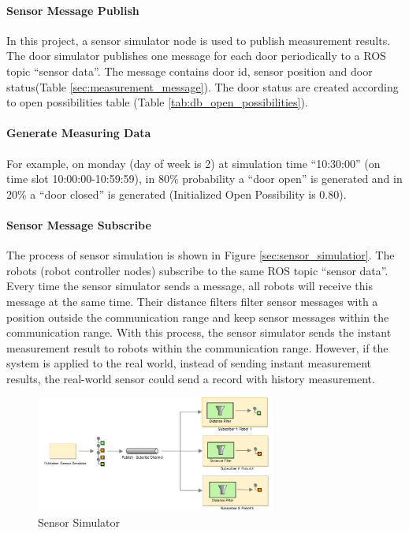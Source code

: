 \paragraph{Sensor Message Publish}
In this project, a sensor simulator node is used to publish measurement results. The door simulator publishes one message for each door periodically to a ROS topic ``sensor data''. The message contains door id, sensor position and door status(Table \ref{sec:measurement_message}). The door status are created according to open possibilities table (Table \ref{tab:db_open_possibilities}). 


\paragraph{Generate Measuring Data}
For example, on monday (day of week is 2) at simulation time ``10:30:00'' (on time slot 10:00:00-10:59:59), in 80\% probability a ``door open'' is generated and in 20\% a ``door closed'' is generated (Initialized Open Possibility is 0.80).


\paragraph{Sensor Message Subscribe}
The process of sensor simulation is shown in Figure \ref{sec:sensor_simulatior}. The robots (robot controller nodes) subscribe to the same ROS topic ``sensor data''. Every time the sensor simulator sends a message, all robots will receive this message at the same time. Their distance filters filter sensor messages with a position outside the communication range and keep sensor messages within the communication range. With this process, the sensor simulator sends the instant measurement result to robots within the communication range. However, if the system is applied to the real world, instead of sending instant measurement results, the real-world sensor could send a record with history measurement.

\begin{figure}
\centering
\includegraphics[width = 0.7\textwidth]{content/images/ch4/sensor_simulator.drawio.png}
\caption{Sensor Simulator}
\label{fig:sensor_simulator}
\end{figure}

